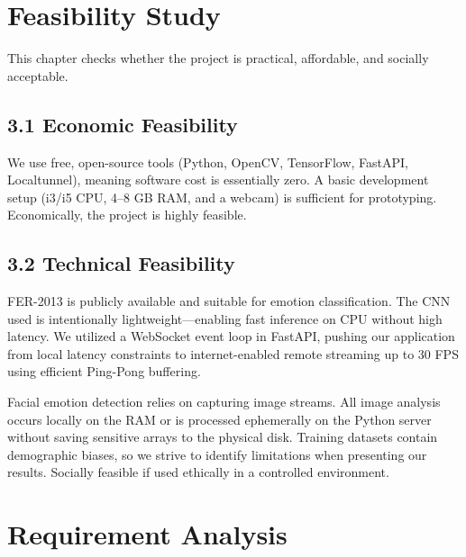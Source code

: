 \documentclass[12pt,a4paper]{report}
\begin{document}
\clearpage


\chapter{Feasibility Study}
This chapter checks whether the project is practical, affordable, and socially acceptable. 

\section*{3.1 Economic Feasibility}
We use free, open-source tools (Python, OpenCV, TensorFlow, FastAPI, Localtunnel), meaning software cost is essentially zero. A basic development setup (i3/i5 CPU, 4–8 GB RAM, and a webcam) is sufficient for prototyping. Economically, the project is highly feasible.

\section*{3.2 Technical Feasibility}
FER-2013 is publicly available and suitable for emotion classification. The CNN used is intentionally lightweight—enabling fast inference on CPU without high latency. We utilized a WebSocket event loop in FastAPI, pushing our application from local latency constraints to internet-enabled remote streaming up to 30 FPS using efficient Ping-Pong buffering.

Facial emotion detection relies on capturing image streams. All image analysis occurs locally on the RAM or is processed ephemerally on the Python server without saving sensitive arrays to the physical disk. Training datasets contain demographic biases, so we strive to identify limitations when presenting our results. Socially feasible if used ethically in a controlled environment.

\clearpage


\chapter{Requirement Analysis}
\end{document}
